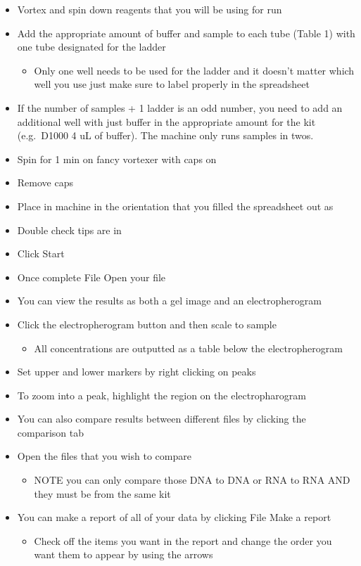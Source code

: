 \documentclass[
  letterpaper,
  DIV=11,
  numbers=noendperiod]{scrreprt}
\providecommand{\tightlist}{%
  \setlength{\itemsep}{0pt}\setlength{\parskip}{0pt}}\usepackage{longtable,booktabs,array}
\begin{document}
\begin{itemize}
\item
  Vortex and spin down reagents that you will be using for run
\item
  Add the appropriate amount of buffer and sample to each tube (Table 1)
  with one tube designated for the ladder

  \begin{itemize}
  \tightlist
  \item
    Only one well needs to be used for the ladder and it doesn't matter
    which well you use just make sure to label properly in the
    spreadsheet
  \end{itemize}
\item
  If the number of samples + 1 ladder is an odd number, you need to add
  an additional well with just buffer in the appropriate amount for the
  kit (e.g.~D1000 4 uL of buffer). The machine only runs samples in
  twos.
\item
  Spin for 1 min on fancy vortexer with caps on
\item
  Remove caps
\item
  Place in machine in the orientation that you filled the spreadsheet
  out as
\item
  Double check tips are in
\item
  Click Start
\item
  Once complete File Open your file
\item
  You can view the results as both a gel image and an electropherogram
\item
  Click the electropherogram button and then scale to sample

  \begin{itemize}
  \tightlist
  \item
    All concentrations are outputted as a table below the
    electropherogram
  \end{itemize}
\item
  Set upper and lower markers by right clicking on peaks
\item
  To zoom into a peak, highlight the region on the electropharogram
\item
  You can also compare results between different files by clicking the
  comparison tab
\item
  Open the files that you wish to compare

  \begin{itemize}
  \tightlist
  \item
    NOTE you can only compare those DNA to DNA or RNA to RNA AND they
    must be from the same kit
  \end{itemize}
\item
  You can make a report of all of your data by clicking File Make a
  report

  \begin{itemize}
  \tightlist
  \item
    Check off the items you want in the report and change the order you
    want them to appear by using the arrows
  \end{itemize}
\end{itemize}
\end{document}

